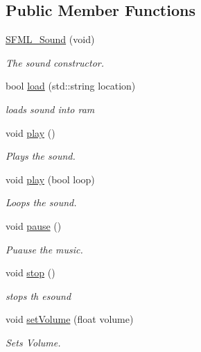 \subsection*{Public Member Functions}
\begin{DoxyCompactItemize}
\item 
\hypertarget{class_s_f_m_l___sound_ad25ea7350ad3d52336a4f29967998846}{\hyperlink{class_s_f_m_l___sound_ad25ea7350ad3d52336a4f29967998846}{S\-F\-M\-L\-\_\-\-Sound} (void)}\label{class_s_f_m_l___sound_ad25ea7350ad3d52336a4f29967998846}

\begin{DoxyCompactList}\small\item\em The sound constructor. \end{DoxyCompactList}\item 
bool \hyperlink{class_s_f_m_l___sound_acbb70e0ad150f26d962cd202828c5015}{load} (std\-::string location)
\begin{DoxyCompactList}\small\item\em loads sound into ram \end{DoxyCompactList}\item 
void \hyperlink{class_s_f_m_l___sound_ad2ce65b43e50b4ee07142a5cd0030b13}{play} ()
\begin{DoxyCompactList}\small\item\em Plays the sound. \end{DoxyCompactList}\item 
void \hyperlink{class_s_f_m_l___sound_a9937189f0ec8103ba7c9c3137afc79e4}{play} (bool loop)
\begin{DoxyCompactList}\small\item\em Loops the sound. \end{DoxyCompactList}\item 
void \hyperlink{class_s_f_m_l___sound_a7992bbbb07d74878f90a98533cbb8227}{pause} ()
\begin{DoxyCompactList}\small\item\em Puause the music. \end{DoxyCompactList}\item 
void \hyperlink{class_s_f_m_l___sound_a81836a7fde08471abee15d721db9aa91}{stop} ()
\begin{DoxyCompactList}\small\item\em stops th esound \end{DoxyCompactList}\item 
void \hyperlink{class_s_f_m_l___sound_abfe2b24292b79a9470c18a756b85f199}{set\-Volume} (float volume)
\begin{DoxyCompactList}\small\item\em Sets Volume. \end{DoxyCompactList}\item 

\end{DoxyCompactItemize}
